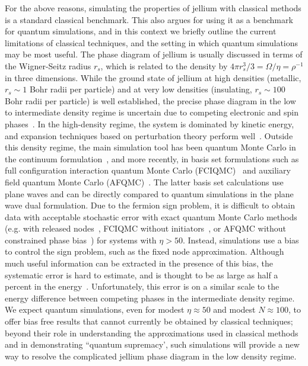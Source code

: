 \documentclass[superscriptaddress,aps,pra,nofootinbib,notitlepage,10pt,longbibliography]{revtex4-1}
\begin{document}
For the above reasons, simulating the properties of jellium with classical methods is a standard classical benchmark. This also argues for using it as a benchmark for quantum simulations, and in this context we briefly outline the current limitations of classical techniques, and the setting in which quantum simulations may be most useful. The phase diagram of jellium is usually discussed in terms of the Wigner-Seitz radius $r_s$, which is related to the density by $4\pi r_s^3 /3 = \Omega / \eta = \rho^{-1}$ in three dimensions. While the ground state of jellium at high densities (metallic, $r_s \sim 1$ Bohr radii per particle) and at very low densities (insulating, $r_s \sim 100$ Bohr radii per particle) is well established,
the precise phase diagram in the low to intermediate density regime is uncertain due to competing electronic and spin phases~\cite{ceperley1980ground,tanatar1989ground,zong2002spin,attaccalite2002correlation,spink2013quantum,drummond2009phase}. 
In the high-density regime, the system is dominated by kinetic energy, and expansion techniques based on perturbation theory perform well~\cite{gell1957correlation,freeman1977coupled}. Outside this density regime, the main simulation tool has been quantum Monte Carlo in the continuum formulation~\cite{ceperley1980ground,tanatar1989ground,zong2002spin,attaccalite2002correlation,spink2013quantum,drummond2009phase}, and more recently, in basis set formulations such as full configuration interaction quantum Monte Carlo (FCIQMC)~\cite{shepherd2012full,shepherd2012investigation} and auxiliary field quantum Monte Carlo (AFQMC)~\cite{wilson1995constrained,motta2015imaginary}.
The latter basis set calculations use plane waves and can be directly compared to quantum simulations in the plane wave dual formulation.
Due to the fermion sign problem, it is difficult to obtain data with acceptable stochastic error with exact quantum Monte Carlo methods (e.g. with released nodes~\cite{ceperley1980ground}, FCIQMC without initiators~\cite{shepherd2012full}, or AFQMC without constrained phase bias~\cite{motta2015imaginary}) for systems with $\eta > 50$. Instead, simulations use a bias to control the sign problem, such as the fixed node approximation. Although much useful information can be extracted in the presence of this bias, the systematic error is hard to estimate, and is thought to be as large as half a percent in the energy~\cite{tanatar1989ground,shepherd2012full}. Unfortunately, this error is on a similar scale to the energy difference between competing phases in the intermediate density regime. We expect quantum simulations, even for modest $\eta \approx 50$ and modest $N \approx 100$, to offer bias free results that cannot currently be obtained by classical techniques; beyond their role in understanding the approximations used in classical methods and in demonstrating ``quantum supremacy', such simulations will provide a new way to resolve the complicated jellium phase diagram in the low  density regime.
\end{document}
